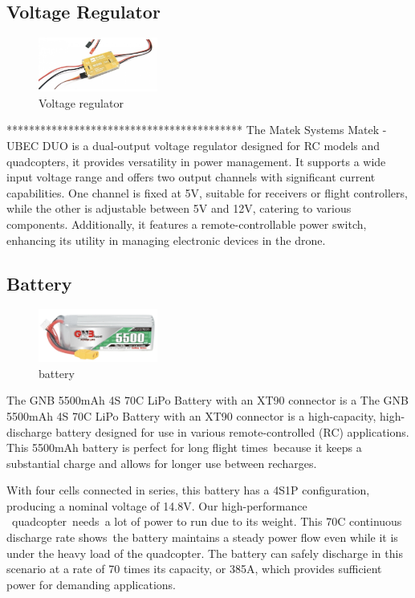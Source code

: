 \documentclass{article}
\begin{document}
\subsection{Voltage Regulator}
\begin{figure}[H]
  \centering
  \includegraphics[width=0.35\textwidth]{Pictures/voltage_regulator.png}
  \caption{Voltage regulator}
  \label{fig:voltage_regulator}
\end{figure}
******************************************
The Matek Systems Matek - UBEC DUO is a dual-output voltage regulator designed for RC models and quadcopters, it provides versatility in power management. It supports a wide input voltage range and offers two output channels with significant current capabilities. One channel is fixed at 5V, suitable for receivers or flight controllers, while the other 
is adjustable between 5V and 12V, catering to various components. Additionally, it features a remote-controllable power switch, enhancing its utility in managing electronic devices in the drone.

\subsection{Battery}\label{battery}
\begin{figure}[H]
  \centering
  \includegraphics[width=0.35\textwidth]{Pictures/battery.png}
  \caption{battery}
  \label{fig:battery}
\end{figure}
The GNB 5500mAh 4S 70C LiPo Battery with an XT90 connector is a The GNB 5500mAh 4S 70C LiPo Battery with an XT90 connector is a high-capacity, high-discharge battery designed for use in various remote-controlled (RC) applications. This 5500mAh battery is perfect for long flight times because it keeps a substantial charge and allows for longer use 
between recharges.

With four cells connected in series, this battery has a 4S1P configuration, producing a nominal voltage of 14.8V. Our high-performance  quadcopter needs a lot of power to run due to its weight. This 70C continuous discharge rate shows the battery maintains a steady power flow even while it is under the heavy load of the quadcopter. The battery can 
safely discharge in this scenario at a rate of 70 times its capacity, or 385A, which provides sufficient power for demanding applications.
\end{document}
